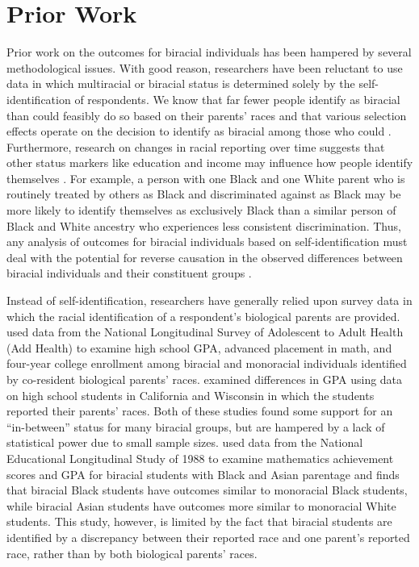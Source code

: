\documentclass[
  12pt,
  letterpaper,
]{article}
\begin{document}
\hypertarget{prior-work}{%
\section{Prior Work}\label{prior-work}}

Prior work on the outcomes for biracial individuals has been hampered by
several methodological issues. With good reason, researchers have been
reluctant to use data in which multiracial or biracial status is
determined solely by the self-identification of respondents. We know
that far fewer people identify as biracial than could feasibly do so
based on their parents' races \autocite{morning_generational_2018} and
that various selection effects operate on the decision to identify as
biracial among those who could
\autocite{roth_end_2005a,davenport_role_2016}. Furthermore, research on
changes in racial reporting over time suggests that other status markers
like education and income may influence how people identify themselves
\autocite{saperstein_racial_2012,saperstein_mulatto_2013}. For example,
a person with one Black and one White parent who is routinely treated by
others as Black and discriminated against as Black may be more likely to
identify themselves as exclusively Black than a similar person of Black
and White ancestry who experiences less consistent discrimination. Thus,
any analysis of outcomes for biracial individuals based on
self-identification must deal with the potential for reverse causation
in the observed differences between biracial individuals and their
constituent groups \autocite{bratter_multiracial_2018}.

Instead of self-identification, researchers have generally relied upon
survey data in which the racial identification of a respondent's
biological parents are provided. \textcite{campbell_multiracial_2009}
used data from the National Longitudinal Survey of Adolescent to Adult
Health (Add Health) to examine high school GPA, advanced placement in
math, and four-year college enrollment among biracial and monoracial
individuals identified by co-resident biological parents' races.
\textcite{herman_blackwhiteother_2009} examined differences in GPA using
data on high school students in California and Wisconsin in which the
students reported their parents' races. Both of these studies found some
support for an ``in-between'' status for many biracial groups, but are
hampered by a lack of statistical power due to small sample sizes.
\textcite{kao_racial_1999} used data from the National Educational
Longitudinal Study of 1988 to examine mathematics achievement scores and
GPA for biracial students with Black and Asian parentage and finds that
biracial Black students have outcomes similar to monoracial Black
students, while biracial Asian students have outcomes more similar to
monoracial White students. This study, however, is limited by the fact
that biracial students are identified by a discrepancy between their
reported race and one parent's reported race, rather than by both
biological parents' races.
\end{document}
